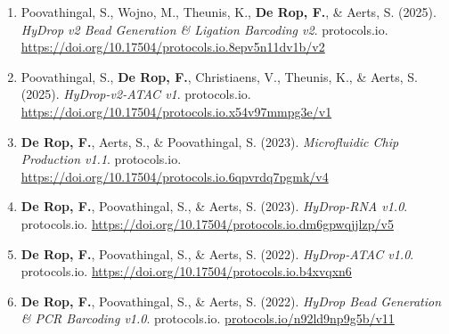 \begin{enumerate}[leftmargin=*,itemsep=0.5\baselineskip]
\item Poovathingal, S., Wojno, M., Theunis, K., \textbf{De Rop, F.}, \& Aerts, S. (2025). \emph{HyDrop v2 Bead Generation \& Ligation Barcoding v2}. protocols.io. \url{https://doi.org/10.17504/protocols.io.8epv5n11dv1b/v2}

\item Poovathingal, S., \textbf{De Rop, F.}, Christiaens, V., Theunis, K., \& Aerts, S. (2025). \emph{HyDrop-v2-ATAC v1}. protocols.io. \url{https://doi.org/10.17504/protocols.io.x54v97mmpg3e/v1}

\item \textbf{De Rop, F.}, Aerts, S., \& Poovathingal, S. (2023). \emph{Microfluidic Chip Production v1.1}. protocols.io. \url{https://doi.org/10.17504/protocols.io.6qpvrdq7pgmk/v4}

\item \textbf{De Rop, F.}, Poovathingal, S., \& Aerts, S. (2023). \emph{HyDrop-RNA v1.0}. protocols.io. \url{https://doi.org/10.17504/protocols.io.dm6gpwqjjlzp/v5}

\item \textbf{De Rop, F.}, Poovathingal, S., \& Aerts, S. (2022). \emph{HyDrop-ATAC v1.0}. protocols.io. \url{https://doi.org/10.17504/protocols.io.b4xvqxn6}

\item \textbf{De Rop, F.}, Poovathingal, S., \& Aerts, S. (2022). \emph{HyDrop Bead Generation \& PCR Barcoding v1.0}. protocols.io. \href{https://www.protocols.io/view/hydrop-bead-generation-amp-pcr-barcoding-v1-0-n92ld9np9g5b/v11}{protocols.io/n92ld9np9g5b/v11}
\end{enumerate}

